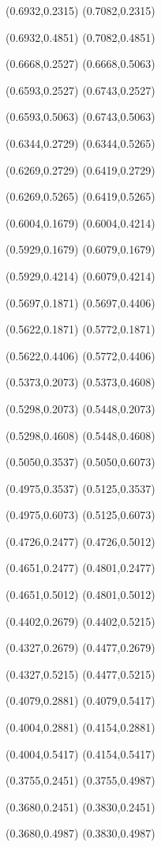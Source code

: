 \PST@Solid(0.6932,0.2315)
(0.7082,0.2315)

\PST@Solid(0.6932,0.4851)
(0.7082,0.4851)

\PST@Solid(0.6668,0.2527)
(0.6668,0.5063)

\PST@Solid(0.6593,0.2527)
(0.6743,0.2527)

\PST@Solid(0.6593,0.5063)
(0.6743,0.5063)

\PST@Solid(0.6344,0.2729)
(0.6344,0.5265)

\PST@Solid(0.6269,0.2729)
(0.6419,0.2729)

\PST@Solid(0.6269,0.5265)
(0.6419,0.5265)

\PST@Solid(0.6004,0.1679)
(0.6004,0.4214)

\PST@Solid(0.5929,0.1679)
(0.6079,0.1679)

\PST@Solid(0.5929,0.4214)
(0.6079,0.4214)

\PST@Solid(0.5697,0.1871)
(0.5697,0.4406)

\PST@Solid(0.5622,0.1871)
(0.5772,0.1871)

\PST@Solid(0.5622,0.4406)
(0.5772,0.4406)

\PST@Solid(0.5373,0.2073)
(0.5373,0.4608)

\PST@Solid(0.5298,0.2073)
(0.5448,0.2073)

\PST@Solid(0.5298,0.4608)
(0.5448,0.4608)

\PST@Solid(0.5050,0.3537)
(0.5050,0.6073)

\PST@Solid(0.4975,0.3537)
(0.5125,0.3537)

\PST@Solid(0.4975,0.6073)
(0.5125,0.6073)

\PST@Solid(0.4726,0.2477)
(0.4726,0.5012)

\PST@Solid(0.4651,0.2477)
(0.4801,0.2477)

\PST@Solid(0.4651,0.5012)
(0.4801,0.5012)

\PST@Solid(0.4402,0.2679)
(0.4402,0.5215)

\PST@Solid(0.4327,0.2679)
(0.4477,0.2679)

\PST@Solid(0.4327,0.5215)
(0.4477,0.5215)

\PST@Solid(0.4079,0.2881)
(0.4079,0.5417)

\PST@Solid(0.4004,0.2881)
(0.4154,0.2881)

\PST@Solid(0.4004,0.5417)
(0.4154,0.5417)

\PST@Solid(0.3755,0.2451)
(0.3755,0.4987)

\PST@Solid(0.3680,0.2451)
(0.3830,0.2451)

\PST@Solid(0.3680,0.4987)
(0.3830,0.4987)

